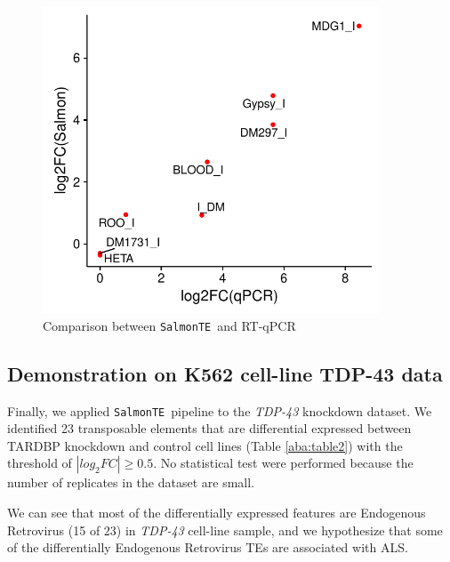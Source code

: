 \documentclass[wsdraft]{ws-procs11x85}
\newcommand{\SalmonTE}{\texttt{SalmonTE}}
\begin{document}
\begin{figure}[h]
\centerline{
\includegraphics[width=10cm]{supp_fig3_corr}
}
\caption{Comparison between \SalmonTE~and RT-qPCR}
\label{aba:fig4}
\end{figure}

\subsection{Demonstration on K562 cell-line TDP-43 data}

Finally, we applied \SalmonTE~pipeline to the \textit{TDP-43} knockdown dataset.
We identified 23 transposable elements that are differential expressed between TARDBP knockdown and control cell lines (Table \ref{aba:table2}) with the threshold of $|log_{2}FC| \geq 0.5$. No statistical test were performed because the number of replicates in the dataset are small. 

We can see that most of the differentially expressed features are Endogenous Retrovirus (15 of 23) in \textit{TDP-43} cell-line sample, and we hypothesize that some of the differentially Endogenous Retrovirus TEs are associated with ALS.
\end{document}
